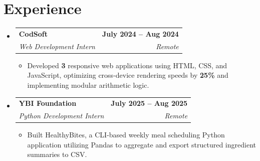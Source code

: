 \documentclass[letterpaper,11pt]{article}
\makeatletter
\newcommand{\resumeItem}[1]{
  \item\small{
    {#1 \vspace{-2pt}}
  }
}
\newcommand{\resumeSubheading}[4]{
  \vspace{-2pt}\item
    \begin{tabular*}{1.0\textwidth}[t]{l@{\extracolsep{\fill}}r}
      \textbf{#1} & \textbf{\small #2} \\
      \textit{\small#3} & \textit{\small #4} \\
    \end{tabular*}\vspace{-7pt}
}
\newcommand{\resumeSubHeadingListStart}{\begin{itemize}[leftmargin=0.0in, label={}]}
\newcommand{\resumeSubHeadingListEnd}{\end{itemize}}
\newcommand{\resumeItemListStart}{\begin{itemize}}
\newcommand{\resumeItemListEnd}{\end{itemize}\vspace{-5pt}}
\makeatother
\begin{document}
\section{Experience}
  \resumeSubHeadingListStart
    \resumeSubheading
      {CodSoft}{July 2024 -- Aug 2024}
      {Web Development Intern}{Remote}
      \resumeItemListStart
        \resumeItem{Developed \textbf{3} responsive web applications using HTML, CSS, and JavaScript, optimizing cross-device rendering speeds by \textbf{25\%} and implementing modular arithmetic logic.}
      \resumeItemListEnd
    \resumeSubheading
      {YBI Foundation}{July 2025 -- Aug 2025}
      {Python Development Intern}{Remote}
      \resumeItemListStart
        \resumeItem{Built HealthyBites, a CLI-based weekly meal scheduling Python application utilizing Pandas to aggregate and export structured ingredient summaries to CSV.}
      \resumeItemListEnd
  \resumeSubHeadingListEnd
\vspace{-16pt}

\end{document}

